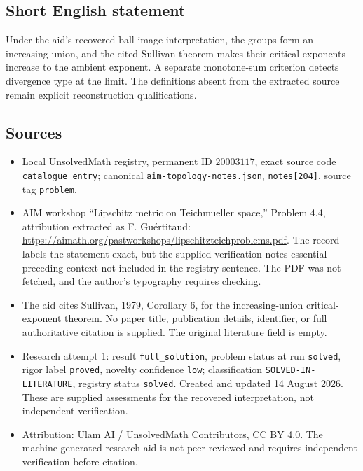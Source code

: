 \documentclass[11pt]{article}
\begin{document}
\subsection{Short English statement}
Under the aid's recovered ball-image interpretation, the groups form an increasing union, and the cited Sullivan theorem makes their critical exponents increase to the ambient exponent. A separate monotone-sum criterion detects divergence type at the limit. The definitions absent from the extracted source remain explicit reconstruction qualifications.
\subsection{Sources}
\begin{itemize}
\item Local UnsolvedMath registry, permanent ID \(20003117\), exact source code \texttt{catalogue entry}; canonical \texttt{aim-topology-notes.json}, \texttt{notes[204]}, source tag \texttt{problem}.
\item AIM workshop ``Lipschitz metric on Teichmueller space,'' Problem 4.4, attribution extracted as F. Gu\'ertitaud: \url{https://aimath.org/pastworkshops/lipschitzteichproblems.pdf}. The record labels the statement exact, but the supplied verification notes essential preceding context not included in the registry sentence. The PDF was not fetched, and the author's typography requires checking.
\item The aid cites Sullivan, 1979, Corollary 6, for the increasing-union critical-exponent theorem. No paper title, publication details, identifier, or full authoritative citation is supplied. The original literature field is empty.
\item Research attempt 1: result \texttt{full\_solution}, problem status at run \texttt{solved}, rigor label \texttt{proved}, novelty confidence \texttt{low}; classification \texttt{SOLVED-IN-LITERATURE}, registry status \texttt{solved}. Created and updated 14 August 2026. These are supplied assessments for the recovered interpretation, not independent verification.
\item Attribution: Ulam AI / UnsolvedMath Contributors, CC BY 4.0. The machine-generated research aid is not peer reviewed and requires independent verification before citation.
\end{itemize}
\end{document}
